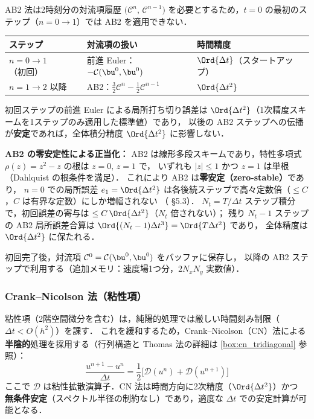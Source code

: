 \begin{tcolorbox}[warnbox, title={AB2 スタートアップ問題：初回ステップの特別処理}]
\label{warn:ab2_startup}

AB2 法は2時刻分の対流項履歴
$\bigl(\mathcal{C}^n,\,\mathcal{C}^{n-1}\bigr)$
を必要とするため，$t=0$ の最初のステップ（$n=0\to1$）では AB2 を適用できない．

\begin{center}
\renewcommand{\arraystretch}{1.3}
\begin{tabular}{lll}
\hline
ステップ & 対流項の扱い & 時間精度 \\
\hline
$n=0\to1$（初回）& 前進 Euler：$-\mathcal{C}(\bu^0,\bu^0)$ & $\Ord{\Delta t}$（スタートアップ） \\
$n=1\to2$ 以降 & AB2：$\tfrac{3}{2}\mathcal{C}^n - \tfrac{1}{2}\mathcal{C}^{n-1}$ & $\Ord{\Delta t^2}$ \\
\hline
\end{tabular}
\end{center}

初回ステップの前進 Euler による局所打ち切り誤差は $\Ord{\Delta t^2}$（1次精度スキームを1ステップのみ適用した標準値）であり，
以後の AB2 ステップへの伝播が\textbf{安定}であれば，全体積分精度 $\Ord{\Delta t^2}$ に影響しない．

\noindent\textbf{AB2 の零安定性による正当化：}
AB2 は線形多段スキームであり，特性多項式 $\rho(z) = z^2 - z$ の根は $z=0,\,z=1$ で，
いずれも $|z| \leq 1$ かつ $z=1$ は単根（Dahlquist の根条件を満足）．
これにより AB2 は\textbf{零安定（zero-stable）}であり，
$n=0$ での局所誤差 $e_1 = \Ord{\Delta t^2}$ は各後続ステップで高々定数倍（$\leq C$，$C$ は有界な定数）にしか増幅されない
（\cite{DahlquistBjorck1974} §5.3）．
$N_t = T/\Delta t$ ステップ積分で，初回誤差の寄与は $\leq C\,\Ord{\Delta t^2}$（$N_t$ 倍されない）；
残り $N_t - 1$ ステップの AB2 局所誤差合算は $\Ord{(N_t-1)\Delta t^3} = \Ord{T\Delta t^2}$ であり，
全体精度は $\Ord{\Delta t^2}$ に保たれる．

初回完了後，対流項 $\mathcal{C}^0 = \mathcal{C}(\bu^0,\bu^0)$ をバッファに保存し，
以降の AB2 ステップで利用する（追加メモリ：速度場1つ分，$2N_xN_y$ 実数値）．
\end{tcolorbox}

\subsubsection{Crank--Nicolson 法（粘性項）}

粘性項（2階空間微分を含む）は，純陽的処理では厳しい時間刻み制限（$\Delta t < O(h^2)$）を課す．
これを緩和するため，Crank--Nicolson（CN）法による\textbf{半陰的}処理を採用する（行列構造と Thomas 法の詳細は \ref{box:cn_tridiagonal} 参照）：
\begin{equation}
  \frac{u^{n+1} - u^n}{\Delta t} = \frac{1}{2}\bigl[\mathcal{D}(u^n) + \mathcal{D}(u^{n+1})\bigr]
  \label{eq:crank_nicolson}
\end{equation}
ここで $\mathcal{D}$ は粘性拡散演算子．CN 法は時間方向に2次精度（$\Ord{\Delta t^2}$）かつ
\textbf{無条件安定}（スペクトル半径の制約なし）であり，適度な $\Delta t$ での安定計算が可能となる．

